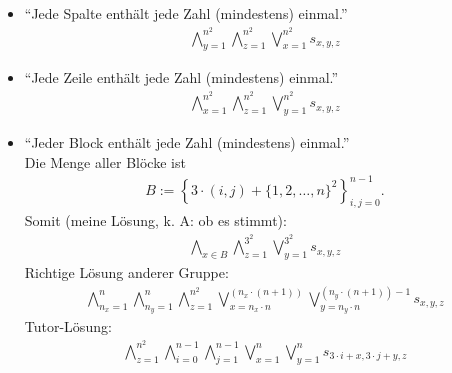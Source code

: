 \documentclass[12pt,a4paper]{article}
\begin{document}
\begin{aufgabe}
\begin{itemize}
\item ``Jede Spalte enthält jede Zahl (mindestens) einmal.''
\begin{align*}
\bigwedge\limits_{y=1}^{n^2}\bigwedge\limits_{z=1}^{n^2}\bigvee\limits_{x=1}^{n^2} s_{x,y,z}
\end{align*}
\item ``Jede Zeile enthält jede Zahl (mindestens) einmal.''
\begin{align*}
\bigwedge\limits_{x=1}^{n^2}\bigwedge\limits_{z=1}^{n^2}\bigvee\limits_{y=1}^{n^2} s_{x,y,z}
\end{align*}
\item ``Jeder Block enthält jede Zahl (mindestens) einmal.''\\
Die Menge aller Blöcke ist
\begin{align*}
B:=\left\lbrace 3\cdot(i,j)+\lbrace1,2,\ldots,n\rbrace^2\right\rbrace_{i,j=0}^{n-1}.
\end{align*}
Somit (meine Lösung, k. A: ob es stimmt):
\begin{align*}
\bigwedge\limits_{x\in B}\bigwedge\limits_{z=1}^{3^2}\bigvee\limits_{y=1}^{3^2} s_{x,y,z}
\end{align*}
Richtige Lösung anderer Gruppe:
\begin{align*}
\bigwedge\limits_{n_x=1}^n\bigwedge\limits_{n_y=1}^n\bigwedge\limits_{z=1}^{n^2}\bigvee\limits_{x=n_x\cdot n}^{(n_x\cdot(n+1))}\bigvee\limits_{y=n_y\cdot n}^{(n_y\cdot(n+1))-1} s_{x,y,z}
\end{align*}
Tutor-Lösung:
\begin{align*}
\bigwedge\limits_{z=1}^{n^2}\bigwedge\limits_{i=0}^{n-1}\bigwedge\limits_{j=1}^{n-1}\bigvee\limits_{x=1}^{n}\bigvee\limits_{y=1}^n s_{3\cdot i+x,3\cdot j+y,z}
\end{align*}
\end{itemize}
\end{aufgabe}
\end{document}
